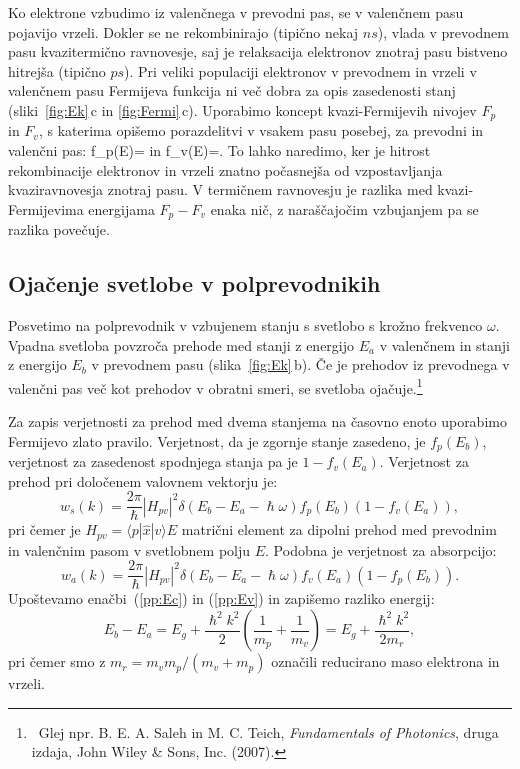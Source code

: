 Ko elektrone vzbudimo iz valenčnega v prevodni pas, se v valenčnem pasu pojavijo
vrzeli. Dokler se ne rekombinirajo (tipično nekaj $\si{ns}$),
vlada v prevodnem pasu kvazitermično ravnovesje, saj je relaksacija 
elektronov znotraj pasu bistveno hitrejša (tipično $\si{ps}$). 
Pri veliki populaciji elektronov v prevodnem in vrzeli v 
valenčnem pasu Fermijeva funkcija ni več dobra za opis zasedenosti stanj 
(sliki~\ref{fig:Ek}\,c in \ref{fig:Fermi}\,c). Uporabimo 
koncept kvazi-Fermijevih nivojev $F_p$ in $F_v$, s katerima opišemo porazdelitvi
v vsakem pasu posebej, za prevodni in valenčni pas:
\beq
f_p(E)=
\label{eq:fDppas}
\eeq
in 
\beq
f_v(E)=.
\label{eq:fDvpas}
\eeq
To lahko naredimo, ker je hitrost rekombinacije elektronov in vrzeli znatno počasnejša
od vzpostavljanja kvaziravnovesja znotraj pasu. V termičnem ravnovesju je razlika med 
kvazi-Fermijevima energijama $F_{p}-F_v$ enaka nič, z naraščajočim vzbujanjem pa se 
razlika povečuje.

\subsection*{Ojačenje svetlobe v polprevodnikih}
Posvetimo na polprevodnik v vzbujenem stanju s svetlobo s krožno frekvenco $\omega$.
Vpadna svetloba povzroča prehode med stanji z energijo $E_a$ v valenčnem 
in stanji z energijo $E_b$ v prevodnem pasu (slika~\ref{fig:Ek}\,b).
Če je prehodov iz prevodnega v valenčni pas več kot prehodov v obratni
smeri, se svetloba ojačuje.\footnote{~Glej npr. B. E. A. Saleh in M. C. Teich, 
{\it Fundamentals of Photonics}, druga izdaja, John Wiley \& Sons, Inc. (2007).}

Za zapis verjetnosti za prehod med dvema stanjema na časovno
enoto uporabimo Fermijevo zlato pravilo. Verjetnost, da je zgornje stanje zasedeno, je 
$f_p(E_b)$, verjetnost za zasedenost spodnjega stanja pa je $1-f_v(E_a)$. Verjetnost 
za prehod pri določenem valovnem vektorju je:
\begin{equation}  
w_s(k)=\frac{2\pi}{\hslash}|H_{pv}|^2\delta(E_b-E_a- \hslash\omega)
f_p(E_b)\left(1-f_v(E_a)\right)\!,
\label{6.5}
\end{equation}
pri čemer je $H_{pv}= \langle p| \hat{x}|v\rangle E $ matrični element za dipolni
prehod  med prevodnim in valenčnim pasom v svetlobnem polju $E$. Podobna je
verjetnost za absorpcijo:
\begin{equation}  
w_a(k)=\frac{2\pi}{\hslash}|H_{pv}|^2\delta(E_b-E_a- \hslash\omega)
f_v(E_a)\left(1-f_p(E_b)\right)\!.
\label{6.6}
\end{equation}
Upoštevamo enačbi~(\ref{pp:Ec}) in (\ref{pp:Ev}) in zapišemo razliko energij:
\begin{equation}  
E_b-E_a= E_g + \frac{\hslash^2 k^2}{2}(\frac{1}{m_p}+ \frac{1}{m_v})= E_g + \frac{\hslash^2 k^2}{2m_r},
\label{6.8}
\end{equation}
pri čemer smo z $m_r=m_v m_p/(m_v+m_p)$ označili reducirano maso elektrona in vrzeli.

